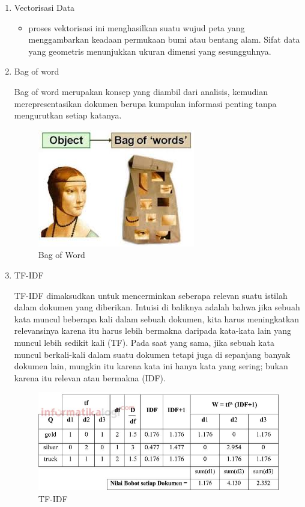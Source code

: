\begin{enumerate}
\item Vectorisasi Data
	\begin{itemize}
		\item proses vektorisasi ini menghasilkan suatu wujud peta yang menggambarkan keadaan permukaan bumi atau bentang alam. Sifat data yang geometris menunjukkan ukuran dimensi yang sesungguhnya.
	\end{itemize}
	
\item Bag of word
	\par Bag of word merupakan konsep yang diambil dari analisis, kemudian merepresentasikan dokumen berupa kumpulan informasi penting tanpa mengurutkan setiap katanya.
	\begin{figure}[ht]
		\centering
		\includegraphics[scale=0.5]{figures/andi/4-5.jpg}
		\caption{Bag of Word}
		\label{Contoh Ilustrasi}
	\end{figure}
	
\item TF-IDF
	\par TF-IDF dimaksudkan untuk mencerminkan seberapa relevan suatu istilah dalam dokumen yang diberikan. Intuisi di baliknya adalah bahwa jika sebuah kata muncul beberapa kali dalam sebuah dokumen, kita harus meningkatkan relevansinya karena itu harus lebih bermakna daripada kata-kata lain yang muncul lebih sedikit kali (TF). Pada saat yang sama, jika sebuah kata muncul berkali-kali dalam suatu dokumen tetapi juga di sepanjang banyak dokumen lain, mungkin itu karena kata ini hanya kata yang sering; bukan karena itu relevan atau bermakna (IDF).
	\begin{figure}[ht]
		\centering
		\includegraphics[scale=0.5]{figures/andi/4-6.jpg}
		\caption{TF-IDF}
		\label{Contoh Ilustrasi}
	\end{figure}
\end{enumerate}